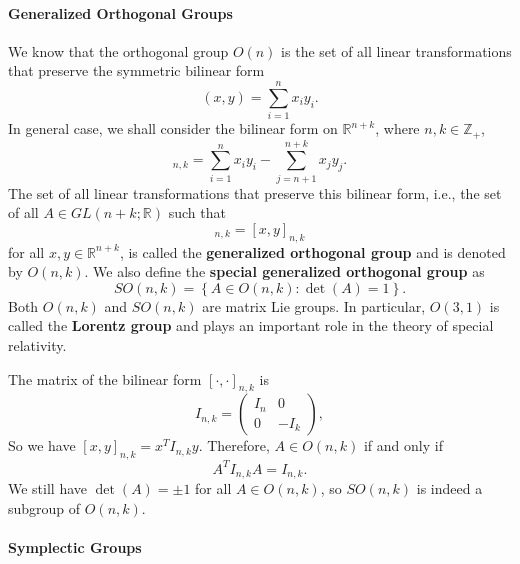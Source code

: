 \documentclass[../main.tex]{subfiles}
\begin{document}
\paragraph{Generalized Orthogonal Groups}
We know that the orthogonal group $O(n)$ is the set of all linear transformations that preserve the symmetric bilinear form
\begin{equation*}
	(x,y) = \sum_{i=1}^n x_i y_i.
\end{equation*}
In general case, we shall consider the bilinear form on $\mathbb{R}^{n+k}$, where $n,k\in \mathbb{Z}_+$,
\begin{equation*}
	[x,y]_{n,k} = \sum_{i=1}^n x_i y_i - \sum_{j=n+1}^{n+k} x_j y_j.
\end{equation*}
The set of all linear transformations that preserve this bilinear form, i.e., the set of all $A \in GL(n+k;\mathbb{R})$ such that
\begin{equation*}
	[Ax,Ay]_{n,k} = [x,y]_{n,k}
\end{equation*}
for all $x,y \in \mathbb{R}^{n+k}$, is called the \textbf{generalized orthogonal group} and is denoted by $O(n,k)$. We also define the \textbf{special generalized orthogonal group} as
\begin{equation*}
	SO(n,k) = \left\{ A \in O(n,k) : \det(A) = 1 \right\}.
\end{equation*}
Both $O(n,k)$ and $SO(n,k)$ are matrix Lie groups. In particular, $O(3,1)$ is called the \textbf{Lorentz group} and plays an important role in the theory of special relativity.

The matrix of the bilinear form $[\cdot,\cdot]_{n,k}$ is
\begin{equation*}
	I_{n,k} = \begin{pmatrix}
		I_n & 0    \\
		0   & -I_k
	\end{pmatrix},
\end{equation*}
So we have $[x,y]_{n,k} = x^T I_{n,k} y$. Therefore, $A \in O(n,k)$ if and only if
\begin{equation*}
	A^T I_{n,k} A = I_{n,k}.
\end{equation*}
We still have $\det(A) = \pm 1$ for all $A \in O(n,k)$, so $SO(n,k)$ is indeed a subgroup of $O(n,k)$.

\paragraph{Symplectic Groups}
\end{document}
